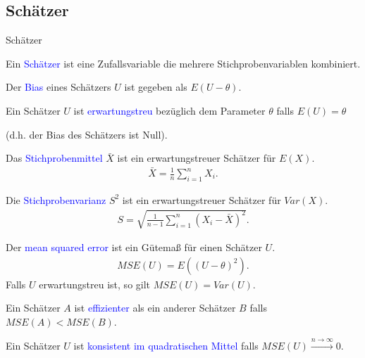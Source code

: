 \documentclass{beamer}
\def\padding{\vspace{0.5cm}}
\def\spadding{\vspace{0.25cm}}
\def\b{\textcolor{blue}}
\begin{document}
\subsection{Schätzer}
\begin{frame}{Schätzer}
    \begin{definition}
        Ein \b{Schätzer} ist eine Zufallsvariable die mehrere Stichprobenvariablen kombiniert.\pause\par\spadding
        Der \b{Bias} eines Schätzers $U$ ist gegeben als $E(U - \theta)$.\pause\par\spadding
        Ein Schätzer $U$ ist \b{erwartungstreu} bezüglich dem Parameter $\theta$ falls $E(U) = \theta$\par
        (d.h. der Bias des Schätzers ist Null).
    \end{definition}
\end{frame}

\begin{frame}
    \begin{definition}
        Das \b{Stichprobenmittel} $\bar{X}$ ist ein erwartungstreuer Schätzer für $E(X)$.
        \begin{align*}
            \bar{X} = \frac{1}{n} \sum_{i=1}^n X_i.
        \end{align*}
    \end{definition}\pause\par\padding
    \begin{definition}
        Die \b{Stichprobenvarianz} $S^2$ ist ein erwartungstreuer Schätzer für $Var(X)$.
        \begin{align*}
            S = \sqrt{\frac{1}{n - 1} \sum_{i=1}^n (X_i - \bar{X})^2}.
        \end{align*}
    \end{definition}
\end{frame}

\begin{frame}
    \begin{definition}
        Der \b{mean squared error} ist ein Gütemaß für einen Schätzer $U$.
        \begin{align*}
            MSE(U) = E((U - \theta)^2).
        \end{align*}\pause
        Falls $U$ erwartungstreu ist, so gilt $MSE(U) = Var(U)$.\pause\par\spadding
        Ein Schätzer $A$ ist \b{effizienter} als ein anderer Schätzer $B$ falls $MSE(A) < MSE(B)$.\par\pause\spadding
        Ein Schätzer $U$ ist \b{konsistent im quadratischen Mittel} falls $MSE(U) \xrightarrow{n \to \infty} 0.$
    \end{definition}
\end{frame}
\end{document}
